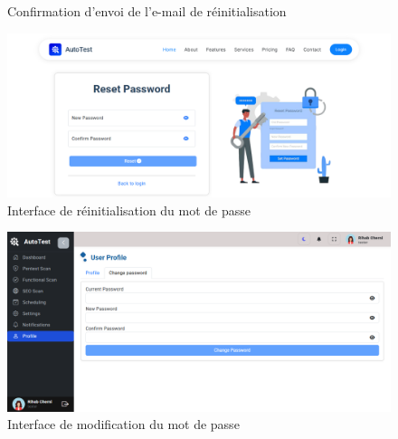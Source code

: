 \begin{justify}
\begin{enumerate}[label=\Alph*.]
\begin{figure}[H]
                    \caption{\centering Confirmation d’envoi de l’e-mail de réinitialisation}
                    \label{fig:reset-password-email}
                \end{figure}
                \vspace{-0.6cm}
                \begin{figure}[H]
                    \centering
                    \includegraphics[width=\linewidth]{chapitres/ch3Sp1/section/sprint1/img/interface/reset-password.PNG}
                    \caption{\centering Interface de réinitialisation du mot de passe}
                    \label{fig:reset-password}
                \end{figure}
                \vspace{-0.6cm}
                \begin{figure}[H]
                    \centering     \includegraphics[width=0.9\linewidth]{chapitres/ch3Sp1/section/sprint1/img/interface/change-profile.png}
                    \caption{\centering Interface de modification du mot de passe}
                    \label{fig:password-update}
                \end{figure}
                 \vspace{-0.6cm}
                \begin{figure}[H]
                    \centering
                    \begin{subfigure}[b]{0.32\linewidth}

\end{subfigure}
\end{figure}
\end{enumerate}
\end{justify}
